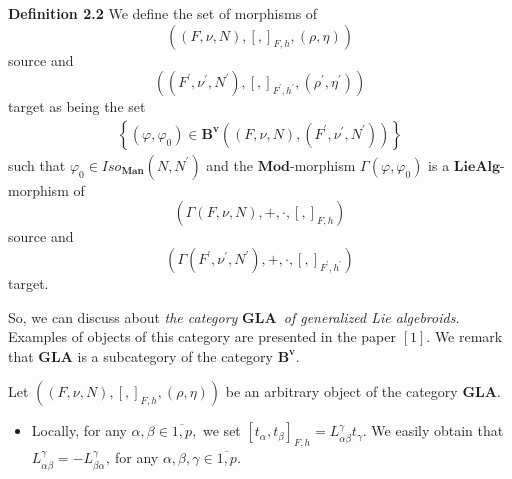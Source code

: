 \documentclass[11pt]{article}
\begin{document}
\textbf{Definition 2.2 }We define the set of morphisms of
\begin{equation*}
\left( \left( F,\nu ,N\right) ,\left[ ,\right] _{F,h},\left( \rho ,\eta
\right) \right)
\end{equation*}%
source and
\begin{equation*}
\left( \left( F^{\prime },\nu ^{\prime },N^{\prime }\right) ,\left[ ,\right]
_{F^{\prime },h^{\prime }},\left( \rho ^{\prime },\eta ^{\prime }\right)
\right)
\end{equation*}%
target as being the set
\begin{equation*}
\begin{array}{c}
\left\{ \left( \varphi ,\varphi _{0}\right) \in \mathbf{B}^{\mathbf{v}%
}\left( \left( F,\nu ,N\right) ,\left( F^{\prime },\nu ^{\prime },N^{\prime
}\right) \right) \right\}%
\end{array}%
\end{equation*}%
such that $\varphi _{0}\in Iso_{\mathbf{Man}}\left( N,N^{\prime }\right) $
and the $\mathbf{Mod}$-morphism $\Gamma \left( \varphi ,\varphi _{0}\right) $
is a $\mathbf{LieAlg}$-morphism of
\begin{equation*}
\left( \Gamma \left( F,\nu ,N\right) ,+,\cdot ,\left[ ,\right] _{F,h}\right)
\end{equation*}%
source and
\begin{equation*}
\left( \Gamma \left( F^{\prime },\nu ^{\prime },N^{\prime }\right) ,+,\cdot
, \left[ ,\right] _{F^{\prime },h^{\prime }}\right)
\end{equation*}%
target.

So, we can discuss about \emph{the category }$\mathbf{GLA}$\emph{\ of
generalized Lie algebroids.} Examples of objects of this category are
presented in the paper $\left[ 1\right] .$ We remark that $\mathbf{GLA}$ is
a subcategory of the category $\mathbf{B}^{\mathbf{v}}.$

Let $\left( \left( F,\nu ,N\right) ,\left[ ,\right] _{F,h},\left( \rho ,\eta
\right) \right) $ be an arbitrary object of the category $\mathbf{GLA}$.

\begin{itemize}
\item Locally, for any $\alpha ,\beta \in \overline{1,p},$ we set $\left[
t_{\alpha },t_{\beta }\right] _{F,h}=L_{\alpha \beta }^{\gamma }t_{\gamma }.$
We easily obtain that $L_{\alpha \beta }^{\gamma }=-L_{\beta \alpha
}^{\gamma },~$for any $\alpha ,\beta ,\gamma \in \overline{1,p}.$
\end{itemize}
\end{document}
